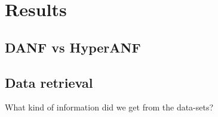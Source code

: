 \chapter{Results}

\section{DANF vs HyperANF}

\section{Data retrieval}
What kind of information did we get from the data-sets?

